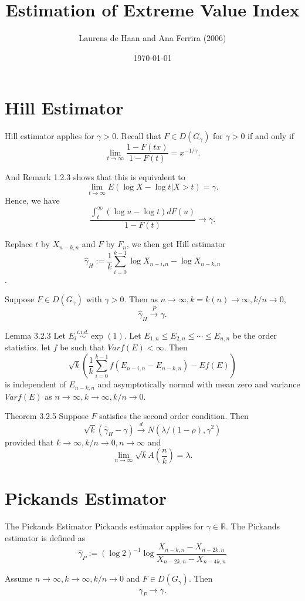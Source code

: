 \documentclass{beamer}
\title{Estimation of Extreme Value Index}
\author{Laurens de Haan and Ana Ferrira (2006)}
\date{\today}
\begin{document}
 

\begin{frame}
    \titlepage
\end{frame}

\section{Hill Estimator}
\begin{frame}
Hill estimator applies for $\gamma>0$.
Recall that $F\in D(G_{\gamma})$ for $\gamma>0$ if and only if
$$
\lim_{t\to \infty} \dfrac{1-F(tx)}{1-F(t)} =x^{-1/\gamma}.
$$

And Remark 1.2.3 shows that this is equivalent to
$$
\lim_{t\to \infty} E(\log X -\log t|X>t)=\gamma.
$$
Hence, we have
$$
\dfrac{\int_{t}^{\infty}(\log u -\log t) dF(u)}{1-F(t)} \to \gamma.
$$
\end{frame}

\begin{frame}
    Replace $t$ by $X_{n-k,n}$ and $F$ by $F_n$, we then get Hill estimator 
    $$
\hat{\gamma}_H:= \dfrac{1}{k} \sum_{i=0}^{k-1} \log X_{n-i,n}-\log X_{n-k,n}
    $$.
\end{frame}


\begin{frame}
    Suppose $F\in D(G_{\gamma})$ with $\gamma>0$. Then as $n \to \infty, k = k(n) \to \infty, k/n \to 0$,
    $$
    \hat{\gamma}_H \stackrel{P}{\to} \gamma.
    $$
\end{frame}

\begin{frame}{Lemma 3.2.3}
    Let $E_i\stackrel{i.i.d.}{\sim } \exp(1)$. Let $E_{1,n} \le E_{2,n}\le \cdots \le E_{n,n}$ be the order statistics. let $f$ be such that $Var f(E) <\infty$. Then 
    $$
\sqrt{k}\left( \dfrac{1}{k} \sum_{i=0}^{k-1} f(E_{n-i,n}-E_{n-k,n})-Ef(E)\right)
    $$
    is independent of $E_{n-k,n}$ and asymptotically normal with mean zero and variance $Var f(E)$ as $n\to \infty,k\to\infty,k/n \to 0$.
\end{frame}


\begin{frame}{Theorem 3.2.5}
    Suppose $F$ satisfies the second order condition. Then 
    $$
\sqrt{k} (\hat{\gamma}_H -\gamma)\stackrel{d}{\to} N(\lambda/(1-\rho),\gamma^2)
    $$
    provided that $k\to \infty, k/n\to 0, n\to \infty$ and
    $$
\lim_{n\to \infty} \sqrt{k}A(\dfrac{n}{k}) =\lambda.
    $$
\end{frame}


\section{Pickands Estimator}
\begin{frame}{The Pickands Estimator}
Pickands estimator applies for $\gamma \in \mathbb{R}$.
The Pickands estimator is defined as 
$$
\hat{\gamma}_P :=(\log 2)^{-1} \log \dfrac{X_{n-k,n}-X_{n-2k,n}}{X_{n-2k,n}-X_{n-4k,n}}
$$

Assume $n\to \infty,k\to\infty,k/n \to 0$ and $F\in D(G_{\gamma})$. Then 
   $$
\hat{\gamma}_P \to \gamma.
   $$
\end{frame}
\end{document}
